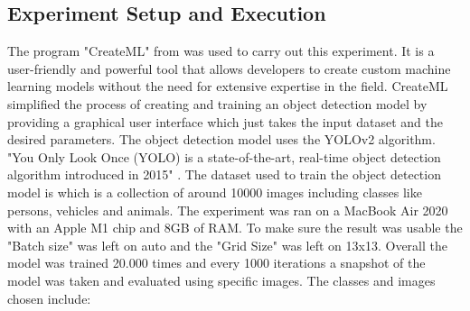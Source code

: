 \subsection{Experiment Setup and Execution}
The program "CreateML" from \cite{Apple} was used to carry out this experiment. It is a user-friendly and powerful 
tool that allows developers to create custom machine learning models without the need for extensive expertise in the field.
CreateML simplified the process of creating and training an object detection model by providing a graphical user interface which 
just takes the input dataset and the desired parameters. The object detection model uses the YOLOv2 \parencite{Jain} algorithm.
"You Only Look Once (YOLO) is a state-of-the-art, real-time object detection algorithm introduced in 2015" \parencite{Keita2022}. 
The dataset used to train the object detection model is  which is a collection of around 10000 images including classes
like persons, vehicles and animals. The experiment was ran on a MacBook Air 2020 with an Apple M1 chip and 8GB of RAM. To make sure the 
result was usable the "Batch size" was left on auto and the "Grid Size" was left on 13x13.
\newpage
Overall the model was trained 20.000 times and every 1000 iterations a snapshot of the model was taken and evaluated using
specific images. 
The classes and images chosen include:
